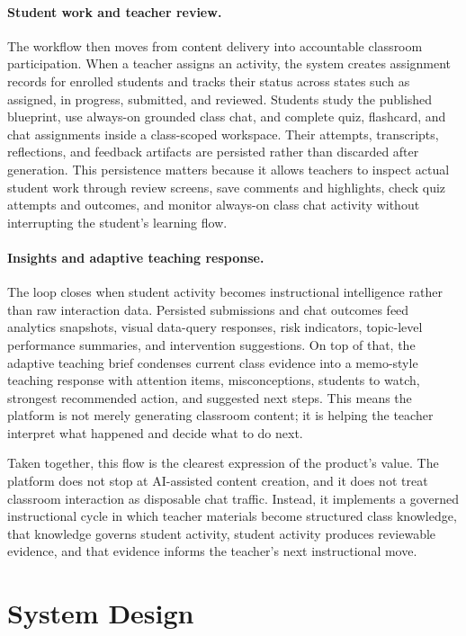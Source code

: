 \documentclass[11pt,a4paper]{article}
\begin{document}
\paragraph*{Student work and teacher review.}
The workflow then moves from content delivery into accountable classroom participation. When a
teacher assigns an activity, the system creates assignment records for enrolled students and tracks
their status across states such as assigned, in progress, submitted, and reviewed. Students study
the published blueprint, use always-on grounded class chat, and complete quiz, flashcard, and chat
assignments inside a class-scoped workspace. Their attempts, transcripts, reflections, and feedback
artifacts are persisted rather than discarded after generation. This persistence matters because it
allows teachers to inspect actual student work through review screens, save comments and highlights,
check quiz attempts and outcomes, and monitor always-on class chat activity without interrupting the
student's learning flow.

\paragraph*{Insights and adaptive teaching response.}
The loop closes when student activity becomes instructional intelligence rather than raw interaction
data. Persisted submissions and chat outcomes feed analytics snapshots, visual data-query responses,
risk indicators, topic-level performance summaries, and intervention suggestions. On top of that, the
adaptive teaching brief condenses current class evidence into a memo-style teaching response with
attention items, misconceptions, students to watch, strongest recommended action, and suggested next
steps. This means the platform is not merely generating classroom content; it is helping the teacher
interpret what happened and decide what to do next.

Taken together, this flow is the clearest expression of the product's value. The platform does not
stop at AI-assisted content creation, and it does not treat classroom interaction as disposable chat
traffic. Instead, it implements a governed instructional cycle in which teacher materials become
structured class knowledge, that knowledge governs student activity, student activity produces
reviewable evidence, and that evidence informs the teacher's next instructional move.

\section{System Design}
\end{document}
